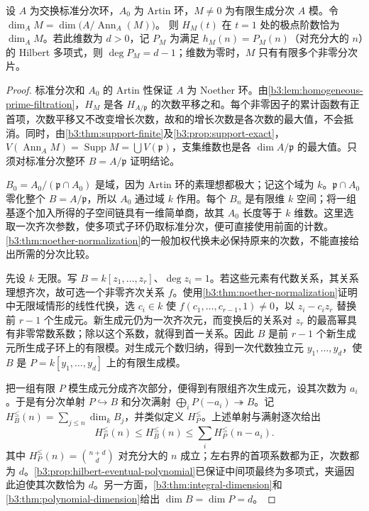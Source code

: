 \begin{theorem}\label{b3:thm:hilbert-polynomial-dimension}
	设 \(A\) 为交换标准分次环，\(A_0\) 为 Artin 环，\(M\ne0\) 为有限生成分次 \(A\) 模。令 \(\dim_A M=\dim\bigl(A/\operatorname{Ann}_A(M)\bigr)\)。 则 \(H_M(t)\) 在 \(t=1\) 处的极点阶数恰为 \(\dim_A M\)。若此维数为 \(d>0\)，记 \(P_M\) 为满足 \(h_M(n)=P_M(n)\)（对充分大的 \(n\)）的 Hilbert 多项式，则 \(\deg P_M=d-1\)；维数为零时，\(M\) 只有有限多个非零分次片。
\end{theorem}
\begin{proof}
	标准分次和 \(A_0\) 的 Artin 性保证 \(A\) 为 Noether 环。由\cref{b3:lem:homogeneous-prime-filtration}，\(H_M\) 是各 \(H_{A/\mathfrak p}\) 的次数平移之和。每个非零因子的累计函数有正首项，次数平移又不改变增长次数，故和的增长次数是各次数的最大值，不会抵消。同时，由\cref{b3:thm:support-finite}及\cref{b3:prop:support-exact}，\(V(\operatorname{Ann}_A M)=\operatorname{Supp}M=\bigcup V(\mathfrak p)\)，支集维数也是各 \(\dim A/\mathfrak p\) 的最大值。只须对标准分次整环 \(B=A/\mathfrak p\) 证明结论。

	\(B_0=A_0/(\mathfrak p\cap A_0)\) 是域，因为 Artin 环的素理想都极大；记这个域为 \(k\)。\(\mathfrak p\cap A_0\) 零化整个 \(B=A/\mathfrak p\)，所以 \(A_0\) 通过域 \(k\) 作用。每个 \(B_n\) 是有限维 \(k\) 空间；将一组基逐个加入所得的子空间链具有一维简单商，故其 \(A_0\) 长度等于 \(k\) 维数。这里选取一次齐次参数，使多项式子环仍取标准分次，便可直接使用前面的计数。\cref{b3:thm:noether-normalization}的一般加权代换未必保持原来的次数，不能直接给出所需的分次比较。

	先设 \(k\) 无限。写 \(B=k[z_1,\ldots,z_r]\)、\(\deg z_i=1\)。若这些元素有代数关系，其关系理想齐次，故可选一个非零齐次关系 \(f\)。使用\cref{b3:thm:noether-normalization}证明中无限域情形的线性代换，选 \(c_i\in k\) 使 \(f(c_1,\ldots,c_{r-1},1)\ne0\)，以 \(z_i-c_i z_r\) 替换前 \(r-1\) 个生成元。新生成元仍为一次齐次元，而变换后的关系对 \(z_r\) 的最高幂具有非零常数系数；除以这个系数，就得到首一关系。因此 \(B\) 是前 \(r-1\) 个新生成元所生成子环上的有限模。对生成元个数归纳，得到一次代数独立元 \(y_1,\ldots,y_d\)，使 \(B\) 是 \(P=k[y_1,\ldots,y_d]\) 上的有限生成模。

	把一组有限 \(P\) 模生成元分成齐次部分，便得到有限组齐次生成元，设其次数为 \(a_i\)。于是有分次单射 \(P\hookrightarrow B\) 和分次满射 \(\bigoplus_iP(-a_i)\twoheadrightarrow B\)。记 \(H_B^{\le}(n)=\sum_{j\le n}\dim_kB_j\)，并类似定义 \(H_P^{\le}\)。上述单射与满射逐次给出
	\[
		H_P^{\le}(n)\le H_B^{\le}(n)\le\sum_i H_P^{\le}(n-a_i).
	\]
	其中 \(H_P^{\le}(n)=\binom{n+d}{d}\) 对充分大的 \(n\) 成立；左右界的首项系数都为正，次数都为 \(d\)。\cref{b3:prop:hilbert-eventual-polynomial}已保证中间项最终为多项式，夹逼因此迫使其次数恰为 \(d\)。另一方面，\cref{b3:thm:integral-dimension}和\cref{b3:thm:polynomial-dimension}给出 \(\dim B=\dim P=d\)。


\end{proof}
